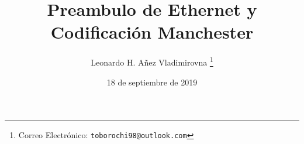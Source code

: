 

\title{Preambulo de Ethernet y Codificación Manchester}

\author{Leonardo H. Añez Vladimirovna%
  \thanks{Correo Electrónico: \texttt{toborochi98@outlook.com}}}
\date{18 de septiembre de 2019}

\maketitle




